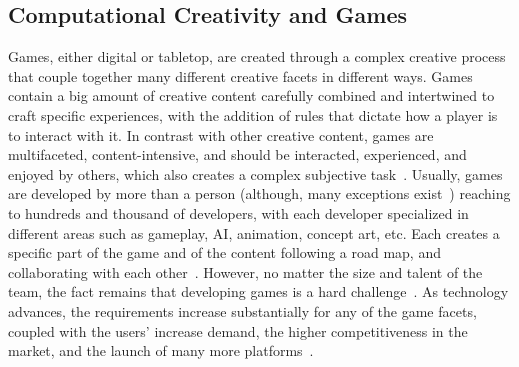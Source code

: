 






\subsection{Computational Creativity and Games}

Games, either digital or tabletop, are created through a complex creative process that couple together many different creative facets in different ways. Games contain a big amount of creative content carefully combined and intertwined to craft specific experiences, with the addition of rules that dictate how a player is to interact with it. In contrast with other creative content, games are multifaceted, content-intensive, and should be interacted, experienced, and enjoyed by others, which also creates a complex subjective task~\cite{Liapis2014-gameCreativity}. Usually, games are developed by more than a person (although, many exceptions exist~\cite{minecraft,undertale,stardewvalley}) reaching to hundreds and thousand of developers, with each developer specialized in different areas such as gameplay, AI, animation, concept art, etc. Each creates a specific part of the game and of the content following a road map, and collaborating with each other~\cite[Chapter~14]{fullerton2004-gamedesign}. However, no matter the size and talent of the team, the fact remains that developing games is a hard challenge~\cite{Blow2004-gamesHard}. As technology advances, the requirements increase substantially for any of the game facets, coupled with the users' increase demand, the higher competitiveness in the market, and the launch of many more platforms~\cite{Washburn2016-gamesPostmorten}.

